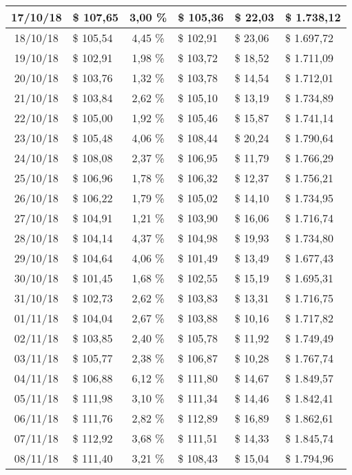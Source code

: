 \begin{center}
\begin{small}
\begin{longtable}{|c|l|c|l|l|l|}
17/10/18 & \$ 107,65 & 3,00 \% & \$ 105,36 & \$ 22,03 & \$ 1.738,12 \\ \hline
18/10/18 & \$ 105,54 & 4,45 \% & \$ 102,91 & \$ 23,06 & \$ 1.697,72 \\ \hline
19/10/18 & \$ 102,91 & 1,98 \% & \$ 103,72 & \$ 18,52 & \$ 1.711,09 \\ \hline
20/10/18 & \$ 103,76 & 1,32 \% & \$ 103,78 & \$ 14,54 & \$ 1.712,01 \\ \hline
21/10/18 & \$ 103,84 & 2,62 \% & \$ 105,10 & \$ 13,19 & \$ 1.734,89 \\ \hline
22/10/18 & \$ 105,00 & 1,92 \% & \$ 105,46 & \$ 15,87 & \$ 1.741,14 \\ \hline
23/10/18 & \$ 105,48 & 4,06 \% & \$ 108,44 & \$ 20,24 & \$ 1.790,64 \\ \hline
24/10/18 & \$ 108,08 & 2,37 \% & \$ 106,95 & \$ 11,79 & \$ 1.766,29 \\ \hline
25/10/18 & \$ 106,96 & 1,78 \% & \$ 106,32 & \$ 12,37 & \$ 1.756,21 \\ \hline
26/10/18 & \$ 106,22 & 1,79 \% & \$ 105,02 & \$ 14,10 & \$ 1.734,95 \\ \hline
27/10/18 & \$ 104,91 & 1,21 \% & \$ 103,90 & \$ 16,06 & \$ 1.716,74 \\ \hline
28/10/18 & \$ 104,14 & 4,37 \% & \$ 104,98 & \$ 19,93 & \$ 1.734,80 \\ \hline
29/10/18 & \$ 104,64 & 4,06 \% & \$ 101,49 & \$ 13,49 & \$ 1.677,43 \\ \hline
30/10/18 & \$ 101,45 & 1,68 \% & \$ 102,55 & \$ 15,19 & \$ 1.695,31 \\ \hline
31/10/18 & \$ 102,73 & 2,62 \% & \$ 103,83 & \$ 13,31 & \$ 1.716,75 \\ \hline
01/11/18 & \$ 104,04 & 2,67 \% & \$ 103,88 & \$ 10,16 & \$ 1.717,82 \\ \hline
02/11/18 & \$ 103,85 & 2,40 \% & \$ 105,78 & \$ 11,92 & \$ 1.749,49 \\ \hline
03/11/18 & \$ 105,77 & 2,38 \% & \$ 106,87 & \$ 10,28 & \$ 1.767,74 \\ \hline
04/11/18 & \$ 106,88 & 6,12 \% & \$ 111,80 & \$ 14,67 & \$ 1.849,57 \\ \hline
05/11/18 & \$ 111,98 & 3,10 \% & \$ 111,34 & \$ 14,46 & \$ 1.842,41 \\ \hline
06/11/18 & \$ 111,76 & 2,82 \% & \$ 112,89 & \$ 16,89 & \$ 1.862,61 \\ \hline
07/11/18 & \$ 112,92 & 3,68 \% & \$ 111,51 & \$ 14,33 & \$ 1.845,74 \\ \hline
08/11/18 & \$ 111,40 & 3,21 \% & \$ 108,43 & \$ 15,04 & \$ 1.794,96 \\ \hline

\end{longtable}
\end{small}
\end{center}
